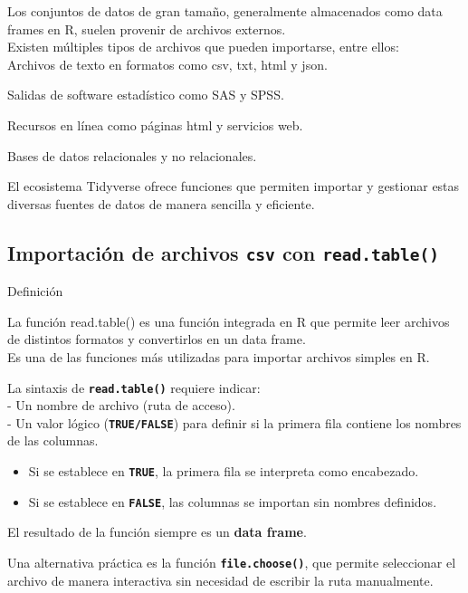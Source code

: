\documentclass[
]{book}
\providecommand{\tightlist}{%
  \setlength{\itemsep}{0pt}\setlength{\parskip}{0pt}}
\begin{document}
Los conjuntos de datos de gran tamaño, generalmente almacenados como data frames en R, suelen provenir de archivos externos.\\
Existen múltiples tipos de archivos que pueden importarse, entre ellos:\\

Archivos de texto en formatos como csv, txt, html y json.

Salidas de software estadístico como SAS y SPSS.

Recursos en línea como páginas html y servicios web.

Bases de datos relacionales y no relacionales.

El ecosistema Tidyverse ofrece funciones que permiten importar y gestionar estas diversas fuentes de datos de manera sencilla y eficiente.

\subsection{\texorpdfstring{Importación de archivos \texttt{csv} con \texttt{read.table()}}{Importación de archivos csv con read.table()}}\label{importaciuxf3n-de-archivos-csv-con-read.table}

{} Definición

La función read.table() es una función integrada en R que permite leer archivos de distintos formatos y convertirlos en un data frame.\\
Es una de las funciones más utilizadas para importar archivos simples en R.

La sintaxis de \textbf{\texttt{read.table()}} requiere indicar:\\
- Un nombre de archivo (ruta de acceso).\\
- Un valor lógico (\textbf{\texttt{TRUE/FALSE}}) para definir si la primera fila contiene los nombres de las columnas.

\begin{itemize}
\tightlist
\item
  Si se establece en \textbf{\texttt{TRUE}}, la primera fila se interpreta como encabezado.\\
\item
  Si se establece en \textbf{\texttt{FALSE}}, las columnas se importan sin nombres definidos.
\end{itemize}

El resultado de la función siempre es un \textbf{data frame}.

Una alternativa práctica es la función \textbf{\texttt{file.choose()}}, que permite seleccionar el archivo de manera interactiva sin necesidad de escribir la ruta manualmente.
\end{document}
